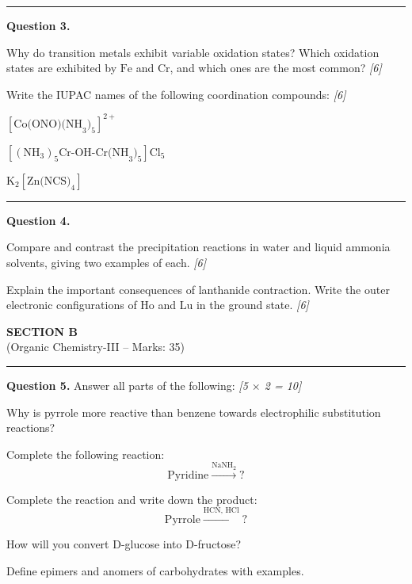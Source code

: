 \documentclass[11pt,a4paper]{article}
\newcommand{\pts}[1]{\hfill   \textit{[#1]}}
\begin{document}
\medskip\rule{\linewidth}{0.2pt}




\noindent   \textbf{Question 3.}

\begin{parts}
  \item Why do transition metals exhibit variable oxidation states? Which oxidation states are exhibited by $ \text{Fe}$ and $ \text{Cr}$, and which ones are the most common? \pts{6}
  \item Write the IUPAC names of the following coordination compounds: \pts{6}
  
\begin{parts}
    \item $[ \text{Co(ONO)(NH}_3 \text{)}_5]^{2+}$
    \item $[( \text{NH}_3)_5 \text{Cr-OH-Cr(NH}_3)_5] \text{Cl}_5$
    \item $ \text{K}_2[ \text{Zn(NCS)}_4]$
  \end{parts}
\end{parts}

\medskip\rule{\linewidth}{0.2pt}




\noindent   \textbf{Question 4.}

\begin{parts}
  \item Compare and contrast the precipitation reactions in water and liquid ammonia solvents, giving two examples of each. \pts{6}
  \item Explain the important consequences of lanthanide contraction. Write the outer electronic configurations of $ \text{Ho}$ and $ \text{Lu}$ in the ground state. \pts{6}
\end{parts}


\newpage

\begin{center}
  {\large\bfseries SECTION B}\\[2pt]
  {\normalsize (Organic Chemistry-III -- Marks: 35)}
\end{center}
\rule{0.4\linewidth}{0.2pt}
\smallskip




\noindent   \textbf{Question 5.} Answer all parts of the following: \pts{5 $ \times$ 2 = 10}

\begin{parts}
  \item Why is pyrrole more reactive than benzene towards electrophilic substitution reactions?
  \item Complete the following reaction:
    \[  \text{Pyridine} \xrightarrow{ \text{NaNH}_2} ? \]
  \item Complete the reaction and write down the product:
    \[  \text{Pyrrole} \xrightarrow{ \text{HCN, HCl}} ? \]
  \item How will you convert D-glucose into D-fructose?
  \item Define epimers and anomers of carbohydrates with examples.
\end{parts}
\end{document}
